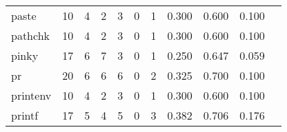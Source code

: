 \begin{longtable}{lp{1.2cm}p{1.2cm}p{1.2cm}p{1.2cm}p{1.2cm}p{1.2cm}p{1.2cm}p{1.2cm}p{1.2cm}p{1.2cm}}
paste     &                                    10 &                                                  4 &                                                  2 &                                                  3 &                                                  0 &                                                  1 &                                         0.300 &                                              0.600 &                                              0.100 \\
pathchk   &                                    10 &                                                  4 &                                                  2 &                                                  3 &                                                  0 &                                                  1 &                                         0.300 &                                              0.600 &                                              0.100 \\
pinky     &                                    17 &                                                  6 &                                                  7 &                                                  3 &                                                  0 &                                                  1 &                                         0.250 &                                              0.647 &                                              0.059 \\
pr        &                                    20 &                                                  6 &                                                  6 &                                                  6 &                                                  0 &                                                  2 &                                         0.325 &                                              0.700 &                                              0.100 \\
printenv  &                                    10 &                                                  4 &                                                  2 &                                                  3 &                                                  0 &                                                  1 &                                         0.300 &                                              0.600 &                                              0.100 \\
printf    &                                    17 &                                                  5 &                                                  4 &                                                  5 &                                                  0 &                                                  3 &                                         0.382 &                                              0.706 &                                              0.176 \\

\end{longtable}
